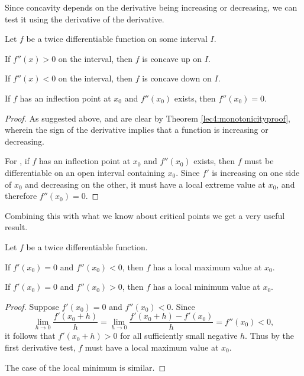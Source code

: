 \noindent
Since concavity depends on the derivative being increasing or decreasing, we can test it using the derivative of the derivative.

\begin{theorem}
	Let $f$ be a twice differentiable function on some interval $I$.
	\begin{romanlist}
		\item If $f''(x) > 0$ on the interval, then $f$ is concave up on $I$.
		\item If $f''(x) < 0$ on the interval, then $f$ is concave down on $I$.
		\item If $f$ has an inflection point at $x_0$ and $f''(x_0)$ exists, then $f''(x_0) = 0$.
	\end{romanlist}
\end{theorem}

\begin{proof}
	As suggested above,  and  are clear by Theorem \ref{lec4:monotonicityproof}, wherein the sign of the derivative implies that a function is increasing or decreasing.

	For , if $f$ has an inflection point at $x_0$ and $f''(x_0)$ exists, then $f$ must be differentiable on an open interval containing $x_0$.
	Since $f'$ is increasing on one side of $x_0$ and decreasing on the other, it must have a local extreme value at $x_0$, and therefore $f''(x_0) = 0$.
\end{proof}

\noindent
Combining this with what we know about critical points we get a very useful result.

\begin{theorem}
	Let $f$ be a twice differentiable function.

	\begin{romanlist}
		\item If $f'(x_0) = 0$ and $f''(x_0) < 0$, then $f$ has a local maximum value at $x_0$.
		\item If $f'(x_0) = 0$ and $f''(x_0) > 0$, then $f$ has a local minimum value at $x_0$.
	\end{romanlist}
\end{theorem}

\begin{proof}
	Suppose $f'(x_0) = 0$ and $f''(x_0) < 0$.
	Since
	\[
		\lim_{h \to 0} \frac{f'(x_0 + h)}{h} = \lim_{h \to 0} \frac{f'(x_0 + h) - f'(x_0)}{h} = f''(x_0) < 0,
	\]
	it follows that $f'(x_0 + h) > 0$ for all sufficiently small negative $h$.
	Thus by the first derivative test, $f$ must have a local maximum value at $x_0$.

	The case of the local minimum is similar.
\end{proof}

